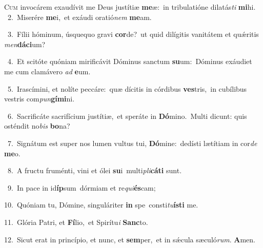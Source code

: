 \lettrine{\initial\textcolor{\initialcolor}{C}}{um} invocárem exaudívit me Deus justítiæ \textbf{me}\-æ:~\star in tribulatióne dilatás\textit{ti} \textbf{mi}\-hi.\\
{\numbfont\textcolor{\numbcolor}{~2.}}~Miserére \textbf{me}\-i,~\star et exáudi oratió\textit{nem} \textbf{me}\-am.\par
{\numbfont\textcolor{\numbcolor}{~3.}}~Fílii hóminum, úsquequo gravi \textbf{cor}\-de?~\star ut quid dilígitis vanitátem et quǽritis \textit{men}\-\textbf{dá}\textbf{ci}um?\par
{\numbfont\textcolor{\numbcolor}{~4.}}~Et scitóte quóniam mirificávit Dóminus sanctum \textbf{su}\-um:~\star Dóminus exáudiet me cum clamávero \textit{ad} \textbf{e}\-um.\par
{\numbfont\textcolor{\numbcolor}{~5.}}~Irascímini, et nolíte peccáre:~\dagger quæ dícitis in córdibus \textbf{ves}\-tris,~\star in cubílibus vestris com\-\textit{pun}\-\textbf{gí}\textbf{mi}ni.\par
{\numbfont\textcolor{\numbcolor}{~6.}}~Sacrificáte sacrifícium justítiæ,~\dagger et speráte in \textbf{Dó}\-mino.~\star Multi dicunt: quis osténdit no\textit{bis} \textbf{bo}\-na?\par
{\numbfont\textcolor{\numbcolor}{~7.}}~Signátum est super nos lumen vultus tui, \textbf{Dó}\-mine:~\star dedísti lætítiam in cor\textit{de} \textbf{me}\-o.\par
{\numbfont\textcolor{\numbcolor}{~8.}}~A fructu fruménti, vini et ólei \textbf{su}\-i~\star multi\-\textit{pli}\-\textbf{cá}\textbf{ti} sunt.\par
{\numbfont\textcolor{\numbcolor}{~9.}}~In pace in id\-\textbf{íp}\-sum~\star dórmiam et re\-\textit{qui}\-\textbf{és}cam;\par
{\numbfont\textcolor{\numbcolor}{10.}}~Quóniam tu, Dómine, singuláriter \textbf{in} spe~\star consti\-\textit{tu}\-\textbf{ís}\textbf{ti} me.\par
{\numbfont\textcolor{\numbcolor}{11.}}~Glória Patri, et \textbf{Fí}\-lio,~\star et Spirítu\textit{i} \textbf{Sanc}\-to.\par
{\numbfont\textcolor{\numbcolor}{12.}}~Sicut erat in princípio, et nunc, et \textbf{sem}\-per,~\star et in sǽcula sæculó\-\textit{rum}\-. \textbf{A}\-men.\par
